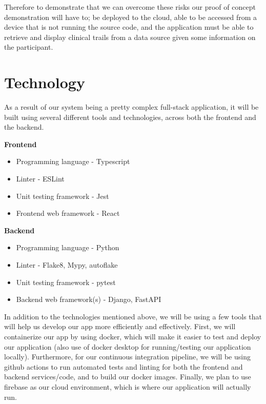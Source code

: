 \documentclass{article}
\begin{document}
Therefore to demonstrate that we can overcome these risks our proof of concept demonstration will have to;
be deployed to the cloud, able to be accessed from a device that is not running the source code,
and the application must be able to retrieve and display clinical trails from a data source given some information on the participant.

\section{Technology}

As a result of our system being a pretty complex full-stack application, it will be built
using several different tools and technologies, across both the frontend and the backend.
\begin{flushleft}
	\textbf{Frontend}
\end{flushleft}

\begin{itemize}
	\item Programming language - Typescript
	\item Linter - ESLint
	\item Unit testing framework - Jest
	\item Frontend web framework - React
\end{itemize}

\begin{flushleft}
	\textbf{Backend}
\end{flushleft}

\begin{itemize}
	\item Programming language - Python
	\item Linter - Flake8, Mypy, autoflake
	\item Unit testing framework - pytest
	\item Backend web framework(s) - Django, FastAPI
\end{itemize}

In addition to the technologies mentioned above, we will be using a few tools that will help us
develop our app more efficiently and effectively. First, we will containerize our app
by using docker, which will make it easier to test and deploy our application (also use of docker desktop for running/testing
our application locally). Furthermore, for our continuous
integration pipeline, we will be using github actions to run automated tests and linting for both the frontend and backend
services/code, and to build our docker images. Finally, we plan to use firebase as our cloud environment, which
is where our application will actually run.
\end{document}
